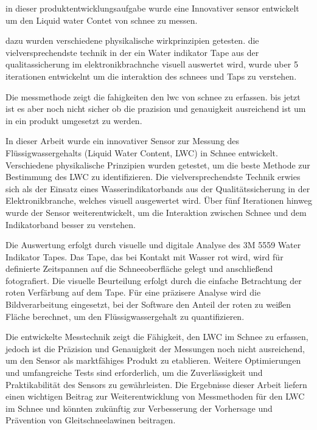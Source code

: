 


in dieser produktentwicklungsaufgabe wurde eine Innovativer sensor entwickelt um den Liquid water Contet von schnee zu messen.

dazu wurden verschiedene physikalische wirkprinzipien getesten. die vielversprechendste technik in der ein Water indikator Tape aus der qualitassicherung im elektronikbrachnche visuell auswertet wird, wurde uber 5 iterationen entwickelnt um die interaktion des schnees und Taps zu verstehen.


Die messmethode zeigt die fahigkeiten den lwc von schnee zu erfassen. bis jetzt ist es aber noch nicht sicher ob die prazision und genauigkeit ausreichend ist um in ein produkt umgesetzt zu werden.


In dieser Arbeit wurde ein innovativer Sensor zur Messung des Flüssigwassergehalts (Liquid Water Content, LWC) in Schnee entwickelt. Verschiedene physikalische Prinzipien wurden getestet, um die beste Methode zur Bestimmung des LWC zu identifizieren. Die vielversprechendste Technik erwies sich als der Einsatz eines Wasserindikatorbands aus der Qualitätssicherung in der Elektronikbranche, welches visuell ausgewertet wird. Über fünf Iterationen hinweg wurde der Sensor weiterentwickelt, um die Interaktion zwischen Schnee und dem Indikatorband besser zu verstehen.

Die Auswertung erfolgt durch visuelle und digitale Analyse des 3M 5559 Water Indikator Tapes. Das Tape, das bei Kontakt mit Wasser rot wird, wird für definierte Zeitspannen auf die Schneeoberfläche gelegt und anschließend fotografiert. Die visuelle Beurteilung erfolgt durch die einfache Betrachtung der roten Verfärbung auf dem Tape. Für eine präzisere Analyse wird die Bildverarbeitung eingesetzt, bei der Software den Anteil der roten zu weißen Fläche berechnet, um den Flüssigwassergehalt zu quantifizieren.

Die entwickelte Messtechnik zeigt die Fähigkeit, den LWC im Schnee zu erfassen, jedoch ist die Präzision und Genauigkeit der Messungen noch nicht ausreichend, um den Sensor als marktfähiges Produkt zu etablieren. Weitere Optimierungen und umfangreiche Tests sind erforderlich, um die Zuverlässigkeit und Praktikabilität des Sensors zu gewährleisten. Die Ergebnisse dieser Arbeit liefern einen wichtigen Beitrag zur Weiterentwicklung von Messmethoden für den LWC im Schnee und könnten zukünftig zur Verbesserung der Vorhersage und Prävention von Gleitschneelawinen beitragen.
